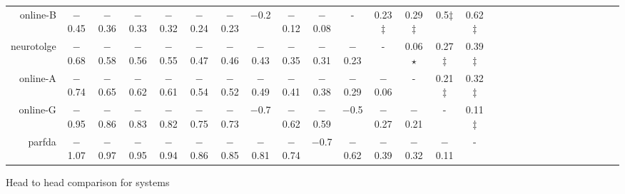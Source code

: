 \begin{tabular}{rccccccccccccccccccccccccccc}
online-B & $-$0.45 & $-$0.36 & $-$0.33 & $-$0.32 & $-$0.24 & $-$0.23 & $-$0.2 & $-$0.12 & $-$0.08 & - &    0.23$\ddagger$ &    0.29$\ddagger$ &    0.5$\ddagger$ &    0.62$\ddagger$ \\ 
neurotolge & $-$0.68 & $-$0.58 & $-$0.56 & $-$0.55 & $-$0.47 & $-$0.46 & $-$0.43 & $-$0.35 & $-$0.31 & $-$0.23 & - &    0.06$\star$ &    0.27$\ddagger$ &    0.39$\ddagger$ \\ 
online-A & $-$0.74 & $-$0.65 & $-$0.62 & $-$0.61 & $-$0.54 & $-$0.52 & $-$0.49 & $-$0.41 & $-$0.38 & $-$0.29 & $-$0.06 & - &    0.21$\ddagger$ &    0.32$\ddagger$ \\ 
online-G & $-$0.95 & $-$0.86 & $-$0.83 & $-$0.82 & $-$0.75 & $-$0.73 & $-$0.7 & $-$0.62 & $-$0.59 & $-$0.5 & $-$0.27 & $-$0.21 & - &    0.11$\ddagger$ \\ 
parfda & $-$1.07 & $-$0.97 & $-$0.95 & $-$0.94 & $-$0.86 & $-$0.85 & $-$0.81 & $-$0.74 & $-$0.7 & $-$0.62 & $-$0.39 & $-$0.32 & $-$0.11 & - \\ 


\end{tabular}
\caption{Head to head comparison for \enET systems}
\label{pairwise-enet}


